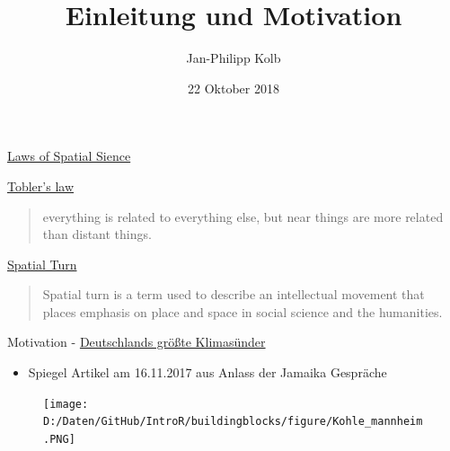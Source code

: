 \documentclass[ignorenonframetext,]{beamer}
\title{Einleitung und Motivation}
\author{Jan-Philipp Kolb}
\date{22 Oktober 2018}
\providecommand{\tightlist}{%
  \setlength{\itemsep}{0pt}\setlength{\parskip}{0pt}}
\begin{document}
\frame{\titlepage}

\begin{frame}{\href{http://de.slideshare.net/rheimann04/big-social-data-the-spatial-turn-in-big-data}{Laws
of Spatial Sience}}

\begin{block}{\href{https://en.wikipedia.org/wiki/Tobler's_first_law_of_geography}{Tobler's
law}}

\begin{quote}
everything is related to everything else, but near things are more
related than distant things.
\end{quote}

\end{block}

\begin{block}{\href{https://de.wikipedia.org/wiki/Spatial_turn}{Spatial
Turn}}

\begin{quote}
Spatial turn is a term used to describe an intellectual movement that
places emphasis on place and space in social science and the humanities.
\end{quote}

\end{block}

\end{frame}

\begin{frame}{Motivation -
\href{http://www.spiegel.de/wissenschaft/mensch/deutschland-das-sind-die-groessten-klimasuender-a-1178207.html}{Deutschlands
größte Klimasünder}}

\begin{itemize}
\tightlist
\item
  Spiegel Artikel am 16.11.2017 aus Anlass der Jamaika Gespräche
\end{itemize}

\begin{figure}
\centering
\texttt{[image: D:/Daten/GitHub/IntroR/buildingblocks/figure/Kohle\_mannheim.PNG]}
\caption{}
\end{figure}

\end{frame}
\end{document}
